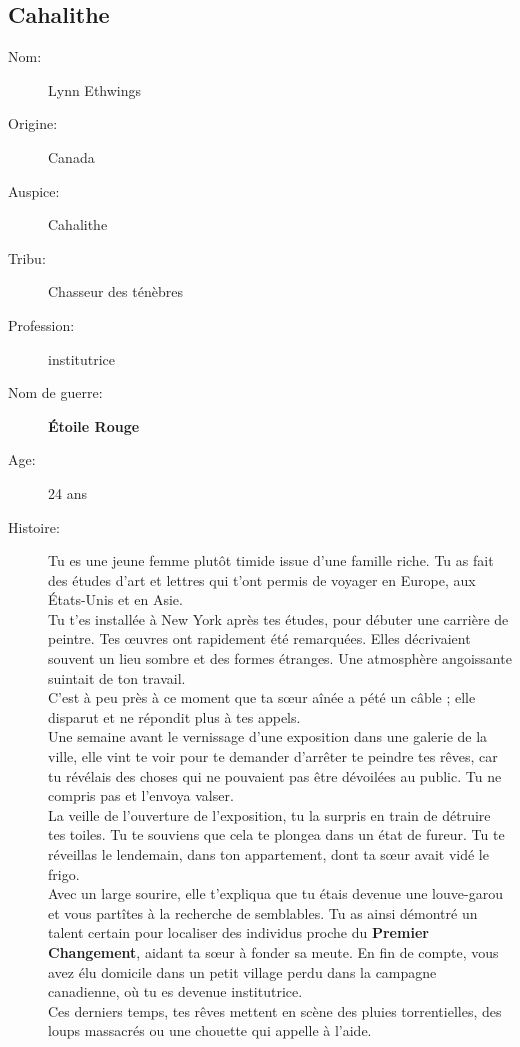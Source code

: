 \documentclass[oneside,12pt]{book}
\newcommand{\Lynn}{\textbf{Étoile Rouge} }
\begin{document}
\begin{flushleft}
\section{Cahalithe}
\begin{description}
\item[Nom:]{Lynn Ethwings}
\item[Origine:]{Canada}
\item[Auspice:]{Cahalithe}
\item[Tribu:]{Chasseur des ténèbres}
\item[Profession:]{institutrice}
\item[Nom de guerre:]{\Lynn}
\item[Age:]{24 ans}
\item[Histoire:]{ 
Tu es une jeune femme plutôt timide issue d'une famille riche. Tu as fait des études d'art et lettres qui t’ont permis de voyager en Europe, aux États-Unis et en Asie. \\
Tu t’es installée à New York après tes études, pour débuter une carrière de peintre. Tes œuvres ont rapidement été remarquées. Elles décrivaient souvent un lieu sombre et des formes étranges. Une atmosphère angoissante suintait de ton travail. \\ 
C’est à peu près à ce moment que ta sœur aînée a pété un câble ; elle disparut et ne répondit plus à tes appels.\\  Une semaine avant le vernissage d’une exposition dans une galerie de la ville, elle vint te voir pour te demander d’arrêter te peindre tes rêves, car tu révélais des choses qui ne pouvaient pas être dévoilées au public. Tu ne compris pas et l’envoya valser.\\
La veille de l'ouverture de l'exposition, tu la surpris en train de détruire tes toiles. Tu te souviens que cela te plongea dans un état de fureur.  Tu te réveillas le lendemain, dans ton appartement, dont ta sœur avait vidé le frigo. \\
Avec un large sourire, elle t'expliqua que tu étais devenue une louve-garou et vous partîtes à la recherche de semblables. Tu as ainsi démontré un talent certain pour localiser des individus proche du \textbf{Premier Changement}, aidant ta sœur à fonder sa meute. En fin de compte, vous avez élu domicile dans un petit village perdu dans la campagne canadienne, où tu es devenue institutrice.\\
Ces derniers temps, tes rêves mettent en scène des pluies torrentielles, des loups massacrés ou une chouette qui appelle à l'aide.\\
}
\end{description}
\end{flushleft}
\end{document}
